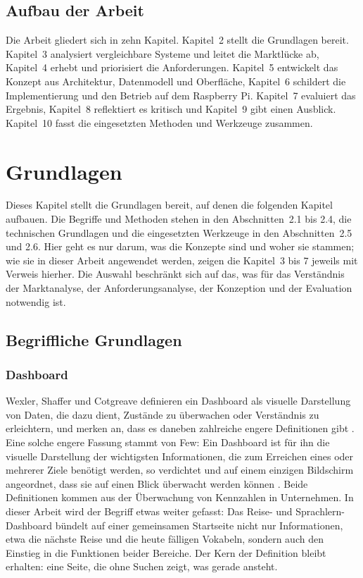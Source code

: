 \documentclass[12pt,a4paper]{scrreprt}
\begin{document}
\section{Aufbau der Arbeit}
Die Arbeit gliedert sich in zehn Kapitel. Kapitel~2 stellt die Grundlagen bereit. Kapitel~3 analysiert vergleichbare Systeme und leitet die Marktlücke ab, Kapitel~4 erhebt und priorisiert die Anforderungen. Kapitel~5 entwickelt das Konzept aus Architektur, Datenmodell und Oberfläche, Kapitel~6 schildert die Implementierung und den Betrieb auf dem Raspberry Pi. Kapitel~7 evaluiert das Ergebnis, Kapitel~8 reflektiert es kritisch und Kapitel~9 gibt einen Ausblick. Kapitel~10 fasst die eingesetzten Methoden und Werkzeuge zusammen.

\chapter{Grundlagen}
Dieses Kapitel stellt die Grundlagen bereit, auf denen die folgenden Kapitel aufbauen. Die Begriffe und Methoden stehen in den Abschnitten~2.1 bis 2.4, die technischen Grundlagen und die eingesetzten Werkzeuge in den Abschnitten~2.5 und 2.6. Hier geht es nur darum, was die Konzepte sind und woher sie stammen; wie sie in dieser Arbeit angewendet werden, zeigen die Kapitel~3 bis 7 jeweils mit Verweis hierher. Die Auswahl beschränkt sich auf das, was für das Verständnis der Marktanalyse, der Anforderungsanalyse, der Konzeption und der Evaluation notwendig ist.

\section{Begriffliche Grundlagen}

\subsection{Dashboard}
Wexler, Shaffer und Cotgreave definieren ein Dashboard als visuelle Darstellung von Daten, die dazu dient, Zustände zu überwachen oder Verständnis zu erleichtern, und merken an, dass es daneben zahlreiche engere Definitionen gibt \cite[Einleitung]{wexler2017}. Eine solche engere Fassung stammt von Few: Ein Dashboard ist für ihn die visuelle Darstellung der wichtigsten Informationen, die zum Erreichen eines oder mehrerer Ziele benötigt werden, so verdichtet und auf einem einzigen Bildschirm angeordnet, dass sie auf einen Blick überwacht werden können \cite[S.~34]{few2006}. Beide Definitionen kommen aus der Überwachung von Kennzahlen in Unternehmen. In dieser Arbeit wird der Begriff etwas weiter gefasst: Das Reise- und Sprachlern-Dashboard bündelt auf einer gemeinsamen Startseite nicht nur Informationen, etwa die nächste Reise und die heute fälligen Vokabeln, sondern auch den Einstieg in die Funktionen beider Bereiche. Der Kern der Definition bleibt erhalten: eine Seite, die ohne Suchen zeigt, was gerade ansteht.
\end{document}
